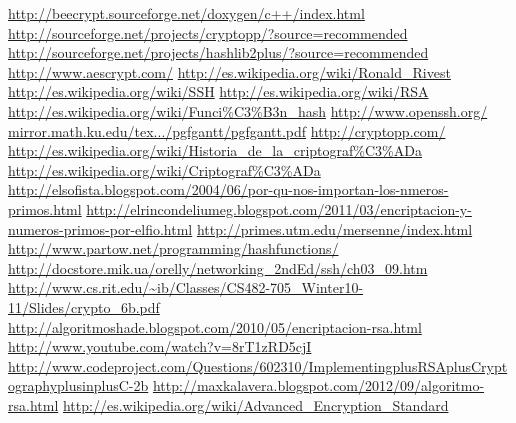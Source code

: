 \documentclass[spanish]{article}
\begin{document}
\begin{thebibliography}{24}

\bibitem{}\url{http://beecrypt.sourceforge.net/doxygen/c++/index.html}
\bibitem{}\url{http://sourceforge.net/projects/cryptopp/?source=recommended}
\bibitem{}\url{http://sourceforge.net/projects/hashlib2plus/?source=recommended}
\bibitem{}\url{http://www.aescrypt.com/}
\bibitem{}\url{http://es.wikipedia.org/wiki/Ronald_Rivest}
\bibitem{}\url{http://es.wikipedia.org/wiki/SSH}
\bibitem{}\url{http://es.wikipedia.org/wiki/RSA}
\bibitem{}\url{http://es.wikipedia.org/wiki/Funci%C3%B3n_hash}
\bibitem{}\url{http://www.openssh.org/}
\bibitem{}\url{mirror.math.ku.edu/tex.../pgfgantt/pgfgantt.pdf}
\bibitem{}\url{http://cryptopp.com/}
\bibitem{}\url{http://es.wikipedia.org/wiki/Historia_de_la_criptograf%C3%ADa}
\bibitem{}\url{http://es.wikipedia.org/wiki/Criptograf%C3%ADa}
\bibitem{}\url{http://elsofista.blogspot.com/2004/06/por-qu-nos-importan-los-nmeros-primos.html}
\bibitem{}\url{http://elrincondeliumeg.blogspot.com/2011/03/encriptacion-y-numeros-primos-por-elfio.html}
\bibitem{}\url{http://primes.utm.edu/mersenne/index.html}
\bibitem{}\url{http://www.partow.net/programming/hashfunctions/}
\bibitem{}\url{http://docstore.mik.ua/orelly/networking_2ndEd/ssh/ch03_09.htm}
\bibitem{}\url{http://www.cs.rit.edu/~ib/Classes/CS482-705_Winter10-11/Slides/crypto_6b.pdf}  
\bibitem{}\url{http://algoritmoshade.blogspot.com/2010/05/encriptacion-rsa.html}
\bibitem{}\url{http://www.youtube.com/watch?v=8rT1zRD5cjI}
\bibitem{}\url{http://www.codeproject.com/Questions/602310/ImplementingplusRSAplusCryptographyplusinplusC-2b}
\bibitem{}\url{http://maxkalavera.blogspot.com/2012/09/algoritmo-rsa.html}
\bibitem{}\url{http://es.wikipedia.org/wiki/Advanced_Encryption_Standard}

\end{thebibliography}
\end{document}
